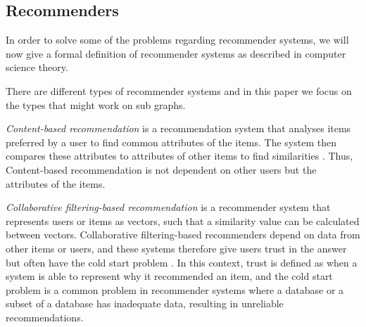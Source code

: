\subsection{Recommenders}
In order to solve some of the problems regarding recommender systems, we will now give a formal definition of recommender systems as described in computer science theory.

There are different types of recommender systems and in this paper we focus on the types that might work on sub graphs.

\textit{Content-based recommendation} is a recommendation system that analyses items preferred by a user to find common attributes of the items. The system then compares these attributes to attributes of other items to find similarities \cite{lu2015recommender}. Thus, Content-based recommendation is not dependent on other users but the attributes of the items.

\textit{Collaborative filtering-based recommendation} is a recommender system that represents users or items as vectors, such that a similarity value can be calculated between vectors. Collaborative filtering-based recommenders depend on data from other items or users, and these systems therefore give users trust in the answer but often have the cold start problem \cite{lu2015recommender}. In this context, trust is defined as when a system is able to represent why it recommended an item, and the cold start problem is a common problem in recommender systems where a database or a subset of a database has inadequate data, resulting in unreliable recommendations\cite{Ricci2015}.
